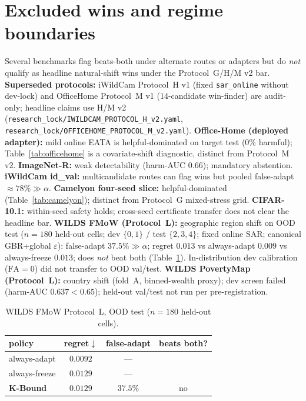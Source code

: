 \documentclass[conference]{IEEEtran}
\theoremstyle{plain}
\theoremstyle{definition}
\begin{document}
\section{Excluded wins and regime boundaries}\label{sec:excluded-wins}
Several benchmarks flag beats-both under alternate routes or adapters but do \emph{not} qualify
as headline natural-shift wins under the Protocol~G/H/M v2 bar. \textbf{Superseded protocols:}
iWildCam Protocol~H v1 (fixed \texttt{sar\_online} without dev-lock) and OfficeHome Protocol~M v1
($14$-candidate win-finder) are audit-only; headline claims use H/M v2
(\texttt{research\_lock/IWILDCAM\_PROTOCOL\_H\_v2.yaml},
\texttt{research\_lock/OFFICEHOME\_PROTOCOL\_M\_v2.yaml}).
\textbf{Office-Home (deployed adapter):} mild online EATA is helpful-dominated on target test
($0\%$ harmful); Table~\ref{tab:officehome} is a covariate-shift diagnostic, distinct from
Protocol~M v2. \textbf{ImageNet-R:} weak detectability (harm-AUC $0.66$); mandatory abstention.
\textbf{iWildCam id\_val:} multicandidate routes can flag wins but pooled false-adapt $\approx 78\%\gg\alpha$.
\textbf{Camelyon four-seed slice:} helpful-dominated (Table~\ref{tab:camelyon}); distinct from
Protocol~G mixed-stress grid. \textbf{CIFAR-10.1:} within-seed safety holds; cross-seed certificate
transfer does not clear the headline bar.
\textbf{WILDS FMoW (Protocol~L):} geographic region shift on OOD test
($n{=}180$ held-out cells; dev $\{0,1\}$ / test $\{2,3,4\}$; fixed online SAR;
canonical GBR+global $\varepsilon$): false-adapt $37.5\%\gg\alpha$; regret
$0.013$ vs always-adapt $0.009$ vs always-freeze $0.013$; does \emph{not} beat both
(Table~\ref{tab:fmow-L}). In-distribution dev calibration ($\mathrm{FA}{=}0$) did not
transfer to OOD val/test.
\textbf{WILDS PovertyMap (Protocol~L):} country shift (fold~A, binned-wealth proxy);
dev screen failed (harm-AUC $0.637{<}0.65$); held-out val/test not run per
pre-registration.

\begin{table}[H]\centering\small
\caption{WILDS FMoW Protocol~L, OOD test ($n{=}180$ held-out cells).}
\label{tab:fmow-L}
\begin{tabular}{lccc}
\toprule
policy & regret$\downarrow$ & false-adapt & beats both? \\
\midrule
always-adapt  & $0.0092$ & --- & \\
always-freeze & $0.0129$ & --- & \\
\textbf{K-Bound} & $0.0129$ & $37.5\%$ & no \\
\bottomrule
\end{tabular}
\end{table}
\clearpage
\end{document}
